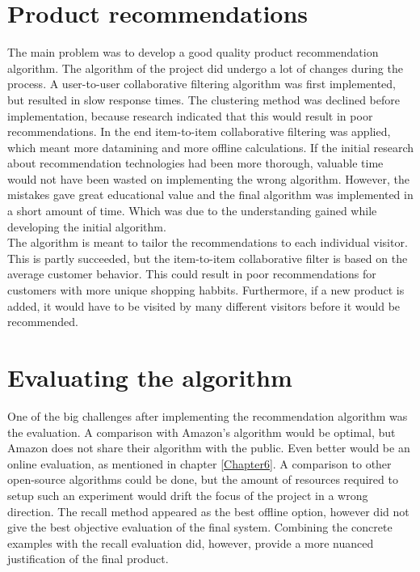 \section{Product recommendations}
The main problem was to develop a good quality product recommendation algorithm. The algorithm of the project did undergo a lot of changes during the process. A user-to-user collaborative filtering algorithm was first implemented, but resulted in slow response times. The clustering method was declined before implementation, because research indicated that this would result in poor recommendations. \cite{AmazonRecommendations} In the end item-to-item collaborative filtering was applied, which meant more datamining and more offline calculations. If the initial research about recommendation technologies had been more thorough, valuable time would not have been wasted on implementing the wrong algorithm. However, the mistakes gave great educational value and the final algorithm was implemented in a short amount of time. Which was due to the understanding gained while developing the initial algorithm.\\
The algorithm is meant to tailor the recommendations to each individual visitor. This is partly succeeded, but the item-to-item collaborative filter is based on the average customer behavior. This could result in poor recommendations for customers with more unique shopping habbits. Furthermore, if a new product is added, it would have to be visited by many different visitors before it would be recommended.

\section{Evaluating the algorithm}
One of the big challenges after implementing the recommendation algorithm was the evaluation. A comparison with Amazon's algorithm would be optimal, but Amazon does not share their algorithm with the public. Even better would be an online evaluation, as mentioned in chapter \ref{Chapter6}. A comparison to other open-source algorithms could be done, but the amount of resources required to setup such an experiment would drift the focus of the project in a wrong direction. The recall method appeared as the best offline option, however did not give the best objective evaluation of the final system. Combining the concrete examples with the recall evaluation did, however, provide a more nuanced justification of the final product.